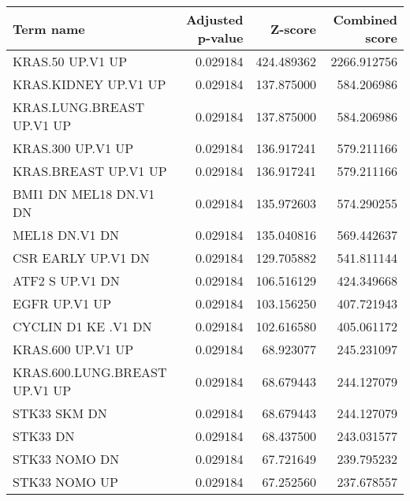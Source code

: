 \begin{tabular}{lrrr}
\toprule
                    Term name &  Adjusted p-value &    Z-score &  Combined score \\
\midrule
             KRAS.50 UP.V1 UP &          0.029184 & 424.489362 &     2266.912756 \\
         KRAS.KIDNEY UP.V1 UP &          0.029184 & 137.875000 &      584.206986 \\
    KRAS.LUNG.BREAST UP.V1 UP &          0.029184 & 137.875000 &      584.206986 \\
            KRAS.300 UP.V1 UP &          0.029184 & 136.917241 &      579.211166 \\
         KRAS.BREAST UP.V1 UP &          0.029184 & 136.917241 &      579.211166 \\
       BMI1 DN MEL18 DN.V1 DN &          0.029184 & 135.972603 &      574.290255 \\
               MEL18 DN.V1 DN &          0.029184 & 135.040816 &      569.442637 \\
           CSR EARLY UP.V1 DN &          0.029184 & 129.705882 &      541.811144 \\
              ATF2 S UP.V1 DN &          0.029184 & 106.516129 &      424.349668 \\
                EGFR UP.V1 UP &          0.029184 & 103.156250 &      407.721943 \\
          CYCLIN D1 KE .V1 DN &          0.029184 & 102.616580 &      405.061172 \\
            KRAS.600 UP.V1 UP &          0.029184 &  68.923077 &      245.231097 \\
KRAS.600.LUNG.BREAST UP.V1 UP &          0.029184 &  68.679443 &      244.127079 \\
                 STK33 SKM DN &          0.029184 &  68.679443 &      244.127079 \\
                     STK33 DN &          0.029184 &  68.437500 &      243.031577 \\
                STK33 NOMO DN &          0.029184 &  67.721649 &      239.795232 \\
                STK33 NOMO UP &          0.029184 &  67.252560 &      237.678557 \\
\bottomrule
\end{tabular}
